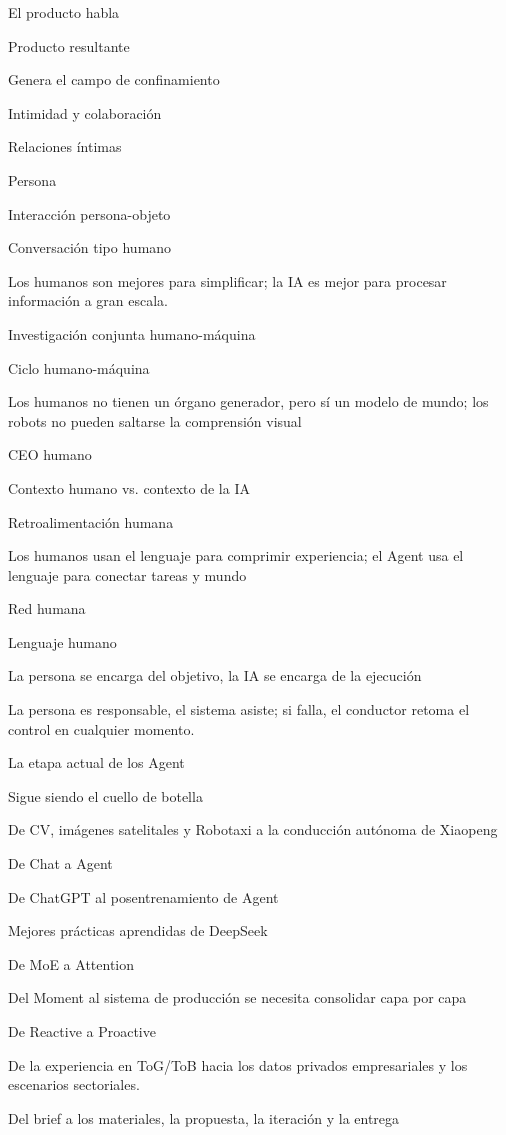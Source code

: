 \documentclass{article}
\begin{document}
El producto habla

Producto resultante

Genera el campo de confinamiento

Intimidad y colaboración

Relaciones íntimas

Persona

Interacción persona-objeto

Conversación tipo humano

Los humanos son mejores para simplificar; la IA es mejor para procesar información a gran escala.

Investigación conjunta humano-máquina

Ciclo humano-máquina

Los humanos no tienen un órgano generador, pero sí un modelo de mundo; los robots no pueden saltarse la comprensión visual

CEO humano

Contexto humano vs. contexto de la IA

Retroalimentación humana

Los humanos usan el lenguaje para comprimir experiencia; el Agent usa el lenguaje para conectar tareas y mundo

Red humana

Lenguaje humano

La persona se encarga del objetivo, la IA se encarga de la ejecución

La persona es responsable, el sistema asiste; si falla, el conductor retoma el control en cualquier momento.

La etapa actual de los Agent

Sigue siendo el cuello de botella

De CV, imágenes satelitales y Robotaxi a la conducción autónoma de Xiaopeng

De Chat a Agent

De ChatGPT al posentrenamiento de Agent

Mejores prácticas aprendidas de DeepSeek

De MoE a Attention

Del Moment al sistema de producción se necesita consolidar capa por capa

De Reactive a Proactive

De la experiencia en ToG/ToB hacia los datos privados empresariales y los escenarios sectoriales.

Del brief a los materiales, la propuesta, la iteración y la entrega
\end{document}
